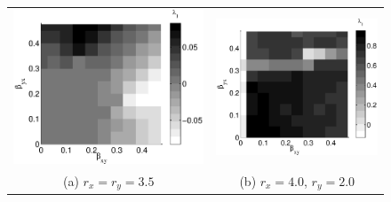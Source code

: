 \documentclass[twocolumn,aps,pre,groupedaddress]{revtex4-1}
\begin{document}
\begin{figure}[ht]
\begin{tabular}{cc}
\includegraphics[scale=0.30]{CoupLogexample_rx35ry35.eps} &
\includegraphics[scale=0.30]{CoupLogexample_rx40ry20.eps} \\
(a) $r_x = r_y = 3.5$ & (b) $r_x = 4.0$, $r_y = 2.0$ \\

\end{tabular}
\end{figure}
\end{document}
